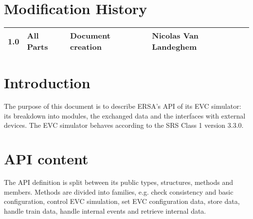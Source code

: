 \documentclass{template/openetcs_article}
\begin{document}
\section*{Modification History}
\begin{supertabular}{| m{1.2cm} | m{1.2cm} | m{6.6cm} | m{4cm} |}
 1.0&All Parts &Document creation&Nicolas Van Landeghem \\\hline
\end{supertabular}


\tableofcontents
\newpage




\section{Introduction}
The purpose of this document is to describe ERSA's API of its EVC simulator: its breakdown into modules, the exchanged data and the interfaces with external devices. The EVC simulator behaves according to the SRS Class 1 version 3.3.0.
\newline
\newpage
\section{API content}
The API definition is split between its public types, structures, methods and members. Methods are divided into families, e.g. check consistency and basic configuration, control EVC simulation, set EVC configuration data, store data, handle train data, handle internal events and retrieve internal data.
\end{document}
